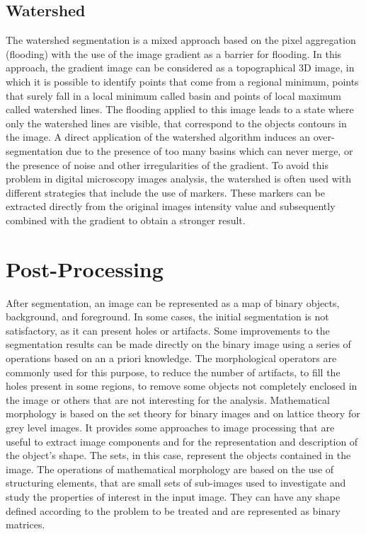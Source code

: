 \subsection{Watershed} \label{watershed} %
The watershed segmentation \cite{Meyer} is a mixed approach based on the pixel aggregation (flooding) with the use of the image gradient as a barrier for flooding. In this approach, the gradient image can be considered as a topographical 3D image, in which it is possible to identify points that come from a regional minimum, points that surely fall in a local minimum called basin and points of local maximum called watershed lines. The flooding applied to this image leads to a state where only the watershed lines are visible, that correspond to the objects contours in the image. A direct application of the watershed algorithm induces an over-segmentation due to the presence of too many basins which can never merge, or the presence of noise and other irregularities of the gradient. To avoid this problem in digital microscopy images analysis, the watershed is often used with different strategies that include the use of markers. These markers can be extracted directly from the original images intensity value and subsequently combined with the gradient to obtain a stronger result.

\section{Post-Processing} \label{postp}
After segmentation, an image can be represented as a map of binary objects, background, and foreground. In some cases, the initial segmentation is not satisfactory, as it can present holes or artifacts. Some improvements to the segmentation results can be made directly on the binary image using a series of operations based on an a priori knowledge. The morphological operators are commonly used for this purpose, to reduce the number of artifacts, to fill the holes present in some regions, to remove some objects not completely enclosed in the image or others that are not interesting for the analysis. Mathematical morphology is based on the set theory for binary images \cite{Serra, Serra2} and on lattice theory for grey level images. It provides some approaches to image processing that are useful to extract image components and for the representation and description of the object's shape. The sets, in this case, represent the objects contained in the image. The operations of mathematical morphology are based on the use of structuring elements, that are small sets of sub-images used to investigate and study the properties of interest in the input image. They can have any shape defined according to the problem to be treated and are represented as binary matrices.

